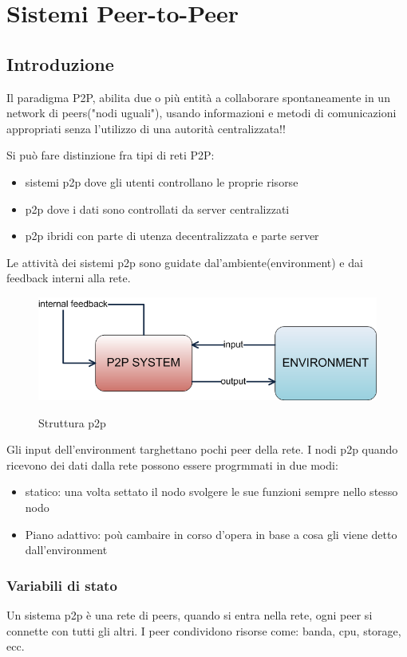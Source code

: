 \section{Sistemi Peer-to-Peer}
\subsection{Introduzione}
Il paradigma P2P, abilita due o più entità a collaborare spontaneamente in un network di peers("nodi uguali"), usando informazioni e metodi di comunicazioni appropriati senza l'utilizzo di una autorità centralizzata!!

Si può fare distinzione fra tipi di reti P2P:
\begin{itemize}
    \item sistemi p2p dove gli utenti controllano le proprie risorse
    \item p2p dove i dati sono controllati da server centralizzati
    \item p2p ibridi con parte di utenza decentralizzata e parte server
\end{itemize}

Le attività dei sistemi p2p sono guidate dal'ambiente(environment) e dai feedback interni alla rete.
\begin{figure}[h!]
    \centering
    \includegraphics[width=0.5\linewidth]{imgs/5 - p2p.png}
    \label{fig:p2p}
    \caption{Struttura p2p}
\end{figure}
Gli input dell'environment targhettano pochi peer della rete.
I nodi p2p quando ricevono dei dati dalla rete possono essere progrmmati in due modi:
\begin{itemize}
    \item statico: una volta settato il nodo svolgere le sue funzioni sempre nello stesso nodo
    \item Piano adattivo: poù cambaire in corso d'opera in base a cosa gli viene detto dall'environment
\end{itemize}

\subsubsection{Variabili di stato}
Un sistema p2p è una rete di peers, quando si entra nella rete, ogni peer si connette con tutti gli altri.
I peer condividono risorse come: banda, cpu, storage, ecc.

